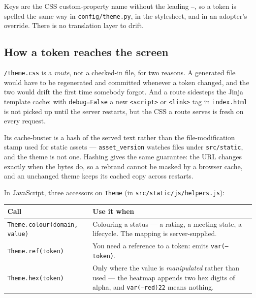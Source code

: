 \documentclass[11pt]{article}
\begin{document}
Keys are the CSS custom-property name without the leading \texttt{--}, so a token is
spelled the same way in \texttt{config/theme.py}, in the stylesheet, and in an adopter's
override. There is no translation layer to drift.

\subsection{How a token reaches the screen}


\texttt{/theme.css} is a \emph{route}, not a checked-in file, for two reasons. A generated
file would have to be regenerated and committed whenever a token changed, and the two would
drift the first time somebody forgot. And a route sidesteps the Jinja template cache: with
\texttt{debug=False} a new \texttt{<script>} or \texttt{<link>} tag in
\texttt{index.html} is not picked up until the server restarts, but the CSS a route serves
is fresh on every request.

Its cache-buster is a hash of the served text rather than the file-modification stamp used
for static assets --- \texttt{asset\_version} watches files under \texttt{src/static}, and
the theme is not one. Hashing gives the same guarantee: the URL changes exactly when the
bytes do, so a rebrand cannot be masked by a browser cache, and an unchanged theme keeps
its cached copy across restarts.

In JavaScript, three accessors on \texttt{Theme} (in \texttt{src/static/js/helpers.js}):

\begin{longtable}{@{}p{}p{}@{}}
\toprule
\textbf{Call} & \textbf{Use it when} \\
\midrule
\endhead
\texttt{Theme.colour(domain, value)} & Colouring a status --- a rating, a meeting state, a
  lifecycle. The mapping is server-supplied. \\
\texttt{Theme.ref(token)} & You need a reference to a token: emits
  \texttt{var(--token)}. \\
\texttt{Theme.hex(token)} & Only where the value is \emph{manipulated} rather than used ---
  the heatmap appends two hex digits of alpha, and \texttt{var(--red)22} means nothing. \\
\bottomrule
\end{longtable}
\end{document}
